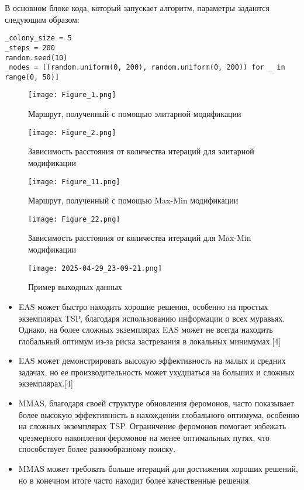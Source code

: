 \documentclass[14pt]{article}
\begin{document}
В основном блоке кода, который запускает алгоритм, параметры задаются следующим образом:

\begin{verbatim}
_colony_size = 5
_steps = 200
random.seed(10)
_nodes = [(random.uniform(0, 200), random.uniform(0, 200)) for _ in range(0, 50)]

\end{verbatim}

\begin{figure}[H]
    \centering
    \texttt{[image: Figure\_1.png]}
    \caption{Маршрут, полученный с помощью элитарной модификации}
    \label{fig:enter-label}
\end{figure}

\begin{figure}[H]
    \centering
    \texttt{[image: Figure\_2.png]}
    \caption{Зависимость расстояния от количества итераций для элитарной модификации}
    \label{fig:enter-label}
\end{figure}

\begin{figure}[H]
    \centering
    \texttt{[image: Figure\_11.png]}
    \caption{Маршрут, полученный с помощью Max-Min модификации}
    \label{fig:enter-label}
\end{figure}

\begin{figure}[H]
    \centering
    \texttt{[image: Figure\_22.png]}
    \caption{Зависимость расстояния от количества итераций для Max-Min модификации}
    \label{fig:enter-label}
\end{figure}

\begin{figure}[H]
    \centering
    \texttt{[image: 2025-04-29\_23-09-21.png]}
    \caption{Пример выходных данных}
    \label{fig:enter-label}
\end{figure}

\begin{itemize}
\item EAS может быстро находить хорошие решения, особенно на простых экземплярах TSP, благодаря использованию информации о всех муравьях. Однако, на более сложных экземплярах EAS может не всегда находить глобальный оптимум из-за риска застревания в локальных минимумах.[4]
\item EAS может демонстрировать высокую эффективность на малых и средних задачах, но ее производительность может ухудшаться на больших и сложных экземплярах.[4]
\item MMAS, благодаря своей структуре обновления феромонов, часто показывает более высокую эффективность в нахождении глобального оптимума, особенно на сложных экземплярах TSP. Ограничение феромонов помогает избежать чрезмерного накопления феромонов на менее оптимальных путях, что способствует более разнообразному поиску.
\item MMAS может требовать больше итераций для достижения хороших решений, но в конечном итоге часто находит более качественные решения.
\end{itemize}
\end{document}
